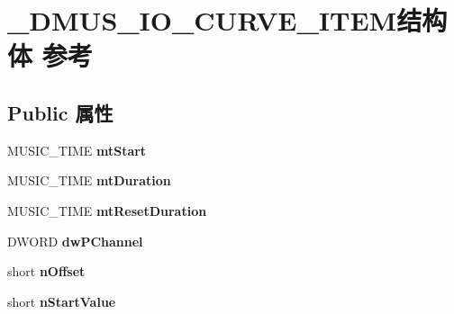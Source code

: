\hypertarget{struct___d_m_u_s___i_o___c_u_r_v_e___i_t_e_m}{}\section{\+\_\+\+D\+M\+U\+S\+\_\+\+I\+O\+\_\+\+C\+U\+R\+V\+E\+\_\+\+I\+T\+E\+M结构体 参考}
\label{struct___d_m_u_s___i_o___c_u_r_v_e___i_t_e_m}
\subsection*{Public 属性}
\begin{DoxyCompactItemize}
\item 
\mbox{\label{struct___d_m_u_s___i_o___c_u_r_v_e___i_t_e_m_ace2efae266299be1ff59d6b6769fda15}} 
M\+U\+S\+I\+C\+\_\+\+T\+I\+ME {\bfseries mt\+Start}
\item 
\mbox{\label{struct___d_m_u_s___i_o___c_u_r_v_e___i_t_e_m_acc55ab9df648b274f7b16807f92155cb}} 
M\+U\+S\+I\+C\+\_\+\+T\+I\+ME {\bfseries mt\+Duration}
\item 
\mbox{\label{struct___d_m_u_s___i_o___c_u_r_v_e___i_t_e_m_ac488dacb5869545f4a568602a13d05a9}} 
M\+U\+S\+I\+C\+\_\+\+T\+I\+ME {\bfseries mt\+Reset\+Duration}
\item 
\mbox{\label{struct___d_m_u_s___i_o___c_u_r_v_e___i_t_e_m_a911a9cd6f78edc247606fc7b17fceef9}} 
D\+W\+O\+RD {\bfseries dw\+P\+Channel}
\item 
\mbox{\label{struct___d_m_u_s___i_o___c_u_r_v_e___i_t_e_m_a6312932ceb55c39d9e91338dc729afe1}} 
short {\bfseries n\+Offset}
\item 
\mbox{\label{struct___d_m_u_s___i_o___c_u_r_v_e___i_t_e_m_a940bc19ac219d75f76c0d43ec283af8d}} 
short {\bfseries n\+Start\+Value}
\item 
\mbox{\label{struct___d_m_u_s___i_o___c_u_r_v_e___i_t_e_m_a8c7a76b2d100adfc680c98fc4fdc5ab9}} 

\end{DoxyCompactItemize}
